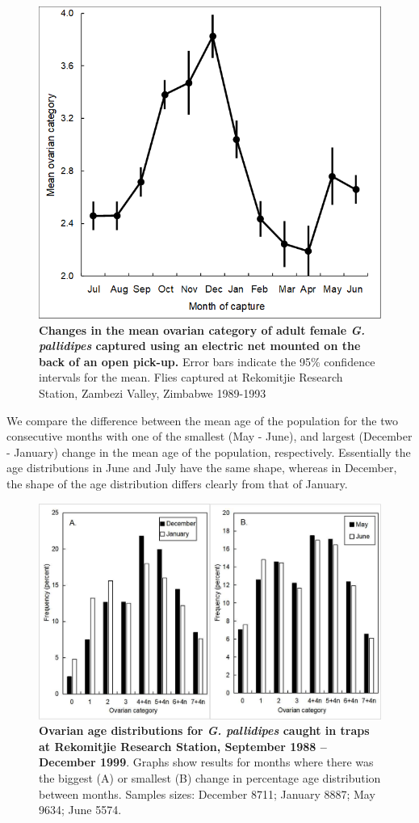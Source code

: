 \documentclass[12pt,a4paper]{article}
\begin{document}
\begin{figure}[hbt!]
	\centering
	\includegraphics[width=0.7\linewidth]{meanAgebymonth}
	\caption{{\bf Changes in the mean ovarian category of adult female \textit{G. pallidipes} captured using an electric net mounted on the back of an open pick-up.} Error bars indicate the 95\% confidence intervals for the mean. Flies captured at Rekomitjie Research Station, Zambezi Valley, Zimbabwe 1989-1993}
	\label{fig:ChiSqrSttistic}
\end{figure}



We compare the difference between the mean age of the population for the two consecutive months with one of the smallest (May - June), and largest (December - January) change in the mean age of the population, respectively. Essentially the age distributions in June and July have the same shape, whereas in December, the shape of the age distribution differs clearly from that of January. 
\begin{figure}[hbt!]
	\centering
	\includegraphics[width=0.9\linewidth]{AgeDistJUNJULDECJAN}
	\caption{{\bf Ovarian age distributions for \textit{G. pallidipes} caught in traps at Rekomitjie Research Station, September 1988 – December 1999}.  Graphs show results for months where there was the biggest (A) or smallest (B) change in percentage age distribution between months. Samples sizes: December 8711; January 8887; May 9634; June 5574. }
	\label{fig:AgeDistJUNJULDECJAN}
\end{figure}
\end{document}

